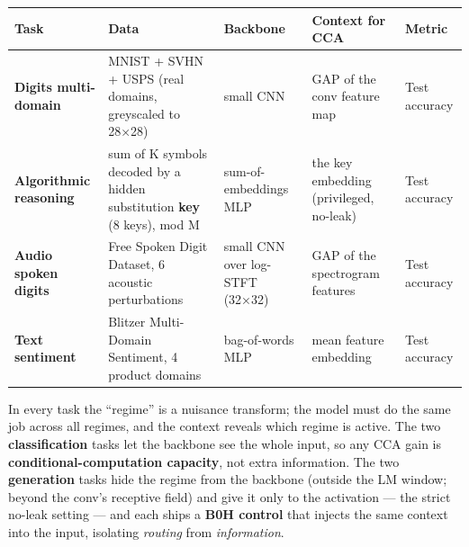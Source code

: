 \documentclass[
  11pt,
]{article}
\newcounter{none} %
\begin{document}
{\def\LTcaptype{none} %
\begin{longtable}[]{@{}
  >{\raggedright\arraybackslash}p{}
  >{\raggedright\arraybackslash}p{}
  >{\raggedright\arraybackslash}p{}
  >{\raggedright\arraybackslash}p{}
  >{\raggedright\arraybackslash}p{}@{}}
\toprule\noalign{}
\begin{minipage}[b]{\linewidth}\raggedright
Task
\end{minipage} & \begin{minipage}[b]{\linewidth}\raggedright
Data
\end{minipage} & \begin{minipage}[b]{\linewidth}\raggedright
Backbone
\end{minipage} & \begin{minipage}[b]{\linewidth}\raggedright
Context for CCA
\end{minipage} & \begin{minipage}[b]{\linewidth}\raggedright
Metric
\end{minipage} \\
\midrule\noalign{}
\endhead
\bottomrule\noalign{}
\endlastfoot
\textbf{Digits multi-domain} & MNIST + SVHN + USPS (real domains,
greyscaled to 28×28) & small CNN & GAP of the conv feature map & Test
accuracy \\
\textbf{Algorithmic reasoning} & sum of K symbols decoded by a hidden
substitution \textbf{key} (8 keys), mod M & sum-of-embeddings MLP & the
key embedding (privileged, no-leak) & Test accuracy \\
\textbf{Audio spoken digits} & Free Spoken Digit Dataset, 6 acoustic
perturbations & small CNN over log-STFT (32×32) & GAP of the spectrogram
features & Test accuracy \\
\textbf{Text sentiment} & Blitzer Multi-Domain Sentiment, 4 product
domains & bag-of-words MLP & mean feature embedding & Test accuracy \\
\end{longtable}
}

In every task the ``regime'' is a nuisance transform; the model must do
the same job across all regimes, and the context reveals which regime is
active. The two \textbf{classification} tasks let the backbone see the
whole input, so any CCA gain is \textbf{conditional-computation
capacity}, not extra information. The two \textbf{generation} tasks hide
the regime from the backbone (outside the LM window; beyond the conv's
receptive field) and give it only to the activation --- the strict
no-leak setting --- and each ships a \textbf{B0H control} that injects
the same context into the input, isolating \emph{routing} from
\emph{information}.
\end{document}
